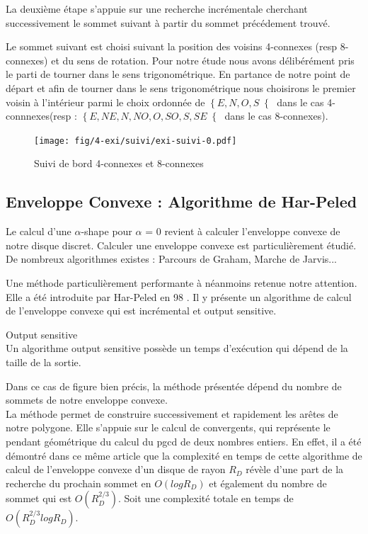 La deuxième étape s'appuie sur une recherche incrémentale cherchant successivement le sommet suivant à partir du sommet précédement trouvé.

Le sommet suivant est choisi suivant la position des voisins 4-connexes (resp 8-connexes) et du sens de rotation. Pour notre étude nous avons délibérément pris le parti de tourner dans le sens trigonométrique. En partance de notre point de départ et afin de tourner dans le sens trigonométrique nous choisirons le premier voisin à l'intérieur parmi le choix ordonnée de $\left\{E, N, O, S\right\{$ dans le cas 4-connnexes(resp :  $\left\{E, NE, N, NO, O, SO, S, SE\right\{$ dans le cas 8-connexes).

\begin{figure}[h!]
  \centering
  \texttt{[image: fig/4-exi/suivi/exi-suivi-0.pdf]}
  \caption{Suivi de bord 4-connexes et 8-connexes}
\end{figure}
  

\subsection{Enveloppe Convexe : Algorithme de Har-Peled}

Le calcul d'une $\alpha$-shape pour $\alpha$ = 0 revient à calculer l'enveloppe convexe de notre disque discret. Calculer une enveloppe convexe est particulièrement étudié. De nombreux algorithmes existes : Parcours de Graham, Marche de Jarvis... 

Une méthode particulièrement performante à néanmoins retenue notre attention. Elle a été introduite par Har-Peled en 98 \cite{HarPeled98}. Il y présente un algorithme de calcul de l'enveloppe convexe qui est incrémental et output sensitive.


\begin{Definition}{Output sensitive}\\
\label{def:os}
      Un algorithme output sensitive possède un temps d’exécution qui dépend de la taille de la sortie.
\end{Definition}

Dans ce cas de figure bien précis, la méthode présentée dépend du nombre de sommets de notre enveloppe convexe. \\

La méthode permet de construire successivement et rapidement les arêtes de notre polygone. Elle s'appuie sur le calcul de convergents, qui représente le pendant géométrique du calcul du pgcd de deux nombres entiers. 
En effet, il a été démontré dans ce même article que la complexité en temps de cette algorithme de calcul de l'enveloppe convexe d'un disque de rayon $R_D$ révèle d'une part de la recherche du prochain sommet en $O(log R_D)$ et également du nombre de sommet qui est $O( R_{D}^{2/3})$. Soit une complexité totale en temps de  $O( R_{D}^{2/3} log R_D)$.


